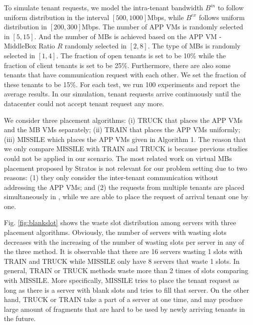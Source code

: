 \documentclass[10pt, conference, letterpaper]{IEEEtran}
\begin{document}
To simulate tenant requests, we model the intra-tenant bandwidth $B^{in}$ to follow uniform distribution in the interval $[500, 1000]$Mbps, while $B^{ex}$ follows uniform distribution in $[200, 300]$Mbps. The number of APP VMs is randomly selected in $[5, 15]$. And the number of MBs is achieved based on the APP VM - MiddleBox Ratio $R$ randomly selected in $[2, 8]$. The type of MBs is randomly selected in $[1,4]$. The fraction of open tenants is set to be 10\% while the fraction of client tenants is set to be 25\%. Furthermore, there are also some tenants that have communication request with each other. We set the fraction of these tenants to be 15\%. For each test, we run 100 experiments and report the average results. In our simulation, tenant requests arrive continuously until the datacenter could not accept tenant request any more.

We consider three placement algorithms: (i) TRUCK that places the APP VMs and the MB VMs separately; (ii) TRAIN that places the APP VMs uniformly; (iii) MISSILE which places the APP VMs given in Algorithm 1. The reason that we only compare MISSILE with TRAIN and TRUCK is because previous studies could not be applied in our scenario. The most related work on virtual MBs placement proposed by Stratos \cite{stratos12} is not relevant for our problem setting due to two reasons: (1) they only consider the inter-tenant communication without addressing the APP VMs; and (2) the requests from multiple tenants are placed simultaneously in \cite{stratos12}, while we are able to place the request of arrival tenant one by one.

Fig. \ref{fig:blankslot} shows the waste slot distribution among servers with three placement algorithms. Obviously, the number of servers with wasting slots decreases with the increasing of the number of wasting slots per server in any of the three method. It is observable that there are 16 servers wasting 1 slots with TRAIN and TRUCK while MISSILE only have 8 servers that waste 1 slots. In general, TRAIN or TRUCK methods waste more than 2 times of slots comparing with MISSILE. More specifically, MISSILE tries to place the tenant request as long as there is a server with blank slots and tries to fill that server. On the other hand, TRUCK or TRAIN take a part of a server at one time, and may produce large amount of fragments that are hard to be used by newly arriving tenants in the future.
\end{document}
